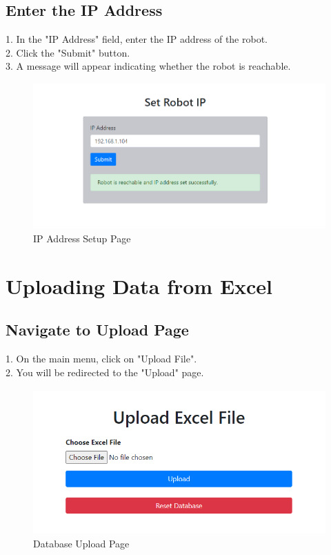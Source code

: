 \documentclass[12pt,a4paper]{scrbook}
\begin{document}
	\subsection{Enter the IP Address}
	1. In the "IP Address" field, enter the IP address of the robot.\\
	2. Click the "Submit" button.\\
	3. A message will appear indicating whether the robot is reachable.\\
		\begin{figure}[H]
		\centering
		\includegraphics[width=\linewidth]{Images/ipsetcor.png}
		\caption{IP Address Setup Page}
		\label{}
	\end{figure}
	
	\section{Uploading Data from Excel}
	
	\subsection{Navigate to Upload Page}
	1. On the main menu, click on "Upload File".\\
	2. You will be redirected to the "Upload" page.\\
	\begin{figure}[H]
		\centering
		\includegraphics[width=\linewidth]{Images/Databasesetter.png}
		\caption{Database Upload Page}
		\label{}
	\end{figure}
	
\end{document}
